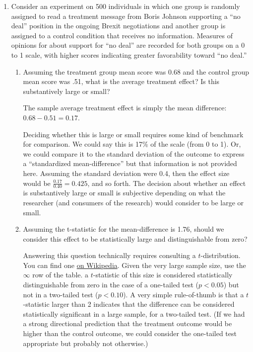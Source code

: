 \documentclass[a4paper,12pt]{exam}
\begin{document}
\begin{enumerate}
\item Consider an experiment on 500 individuals in which one group is randomly assigned to read a treatment message from Boris Johnson supporting a ``no deal'' position in the ongoing Brexit negotiations and another group is assigned to a control condition that receives no information. Measures of opinions for about support for ``no deal'' are recorded for both groups on a 0 to 1 scale, with higher scores indicating greater favorability toward ``no deal.''

\begin{enumerate}
\item Assuming the treatment group mean score was 0.68 and the control group mean score was .51, what is the average treatment effect? Is this substantively large or small?

\begin{solution}
The sample average treatment effect is simply the mean difference: $0.68 - 0.51 = 0.17$.

Deciding whether this is large or small requires some kind of benchmark for comparison. We could say this is 17\% of the scale (from 0 to 1). Or, we could compare it to the standard deviation of the outcome to express a ``standardized mean-difference'' but that information is not provided here. Assuming the standard deviation were 0.4, then the effect size would be $\frac{0.17}{0.40} = 0.425$, and so forth. The decision about whether an effect is substantively large or small is subjective depending on what the researcher (and consumers of the research) would consider to be large or small.
\end{solution}

\item Assuming the t-statistic for the mean-difference is 1.76, should we consider this effect to be statistically large and distinguishable from zero?

\begin{solution}
Answering this question technically requires consulting a $t$-distribution. You can find one \href{https://en.wikipedia.org/wiki/Student\%27s_t-distribution#Table_of_selected_values}{on Wikipedia}. Given the very large sample size, use the $\infty$ row of the table. a $t$-statistic of this size is considered statistically distinguishable from zero in the case of a one-tailed test ($p<0.05$) but not in a two-tailed test ($p<0.10$). A very simple rule-of-thumb is that a $t$-statistic larger than 2 indicates that the difference can be considered statistically significant in a large sample, for a two-tailed test. (If we had a strong directional prediction that the treatment outcome would be higher than the control outcome, we could consider the one-tailed test appropriate but probably not otherwise.)
\end{solution}


\end{enumerate}
\end{enumerate}
\end{document}
